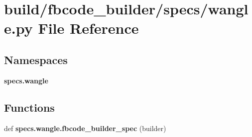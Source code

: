 \section{build/fbcode\+\_\+builder/specs/wangle.py File Reference}
\label{wangle_8py}
\subsection*{Namespaces}
\begin{DoxyCompactItemize}
\item 
 {\bf specs.\+wangle}
\end{DoxyCompactItemize}
\subsection*{Functions}
\begin{DoxyCompactItemize}
\item 
def {\bf specs.\+wangle.\+fbcode\+\_\+builder\+\_\+spec} (builder)
\end{DoxyCompactItemize}
